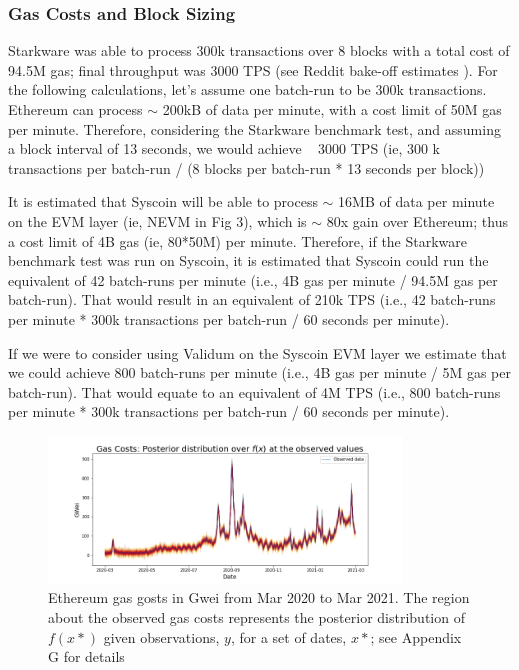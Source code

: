\documentclass[peerreview]{ieeesyscoin}
\begin{document}
\subsubsection{Gas Costs and Block Sizing}

Starkware was able to process 300k transactions over 8 blocks with a total cost of 94.5M gas; final throughput was 3000 TPS (see Reddit bake-off estimates \cite{Sta20b}). For the following calculations, let’s assume one batch-run to be 300k transactions. Ethereum can process $\sim$ 200kB of data per minute, with a cost limit of 50M gas per minute. Therefore, considering the Starkware benchmark test, and assuming a block interval of 13 seconds, we would achieve ~ 3000 TPS (ie,  300 k transactions per batch-run / (8 blocks per batch-run * 13 seconds per block))

It is estimated that Syscoin will be able to process $\sim$ 16MB of data per minute on the EVM layer (ie, NEVM in Fig 3), which is $\sim$ 80x gain over Ethereum; thus a cost limit of 4B gas (ie, 80*50M) per minute. Therefore, if the Starkware benchmark test was run on Syscoin, it is estimated that Syscoin could run the equivalent of 42 batch-runs per minute (i.e., 4B gas per minute / 94.5M gas per batch-run). That would result in an equivalent of 210k TPS (i.e., 42 batch-runs per minute * 300k transactions per batch-run / 60 seconds per minute).

If we were to consider using Validum on the Syscoin EVM layer we estimate that we could achieve 800 batch-runs per minute (i.e., 4B gas per minute / 5M gas per batch-run). That would equate to an equivalent of 4M TPS (i.e., 800 batch-runs per minute * 300k transactions per batch-run / 60 seconds per minute).

\begin{figure}[h!]
\includegraphics[width=3.7in]{img/eth_gas_costs.png}
\caption{Ethereum gas gosts in Gwei from Mar 2020 to Mar 2021. The region about the observed gas costs represents the posterior distribution of $f(x*)$ given observations, $y$, for a set of dates, $x*$; see Appendix G for details}  
\label{fig:eth_gas_costs}
\end{figure} 
\end{document}
